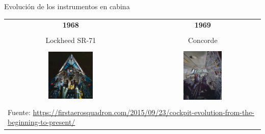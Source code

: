 \begin{frame}{Evoluci\'on de los instrumentos en cabina}
  
  \begin{tabular}{ccc}
    {\bf \large 1968} & & {\bf \large 1969} \\ & & \\
	{Lockheed SR-71 } & & {Concorde} \\ & & \\
    \includegraphics[width=0.35\textwidth]{imagenes/1.1.introduccion/014-lockheed-sr-71a-fas-blackbird.jpg}
	& \hspace{5mm}
	&\includegraphics[width=0.35\textwidth]{imagenes/1.1.introduccion/017-concorde.jpg} \\ & & \\
	\multicolumn{3}{l}{
	{\tiny Fuente: \url{https://firstaerosquadron.com/2015/09/23/cockpit-evolution-from-the-beginning-to-present/}}
}
	\\
  \end{tabular}

\end{frame}




